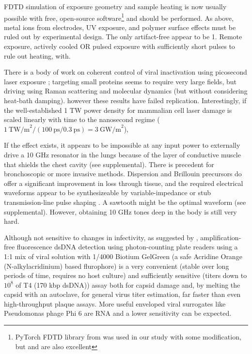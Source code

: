 \documentclass[paper.tex]{subfiles}
\begin{document}
FDTD simulation of exposure geometry and sample heating is now usually possible with free, open-source software\footnote{PyTorch FDTD library from \cite{Highly2019} was used in our study with some modification, but \cite{CUDAbased2019} and \cite{openEMS} are also excellent} and should be performed. As above, metal ions from electrodes, UV exposure, and polymer surface effects\cite{Effect1994a} must be ruled out by experimental design. The only artifact-free appear to be 1. Remote exposure, actively cooled OR pulsed exposure with sufficiently short pulses to rule out heating, with. 

 There is a body of work on coherent control of viral inactivation using picosecond laser exposure \cite{Maximum2010}; targeting small proteins seems to require very large fields\cite{Picosecond2016b}, but driving using Raman scattering \cite{Inactivation2007} \cite{Prospects2012}\cite{Studies2014} and molecular dynamics \cite{Maximum2010} (but without considering heat-bath damping). however these results have failed replication\cite{No2011}. Interestingly, if the well-established 1 TW power density\cite{Targeted2002} for mammalian cell laser damage is scaled linearly with time to the nanosecond regime ($1\ \text{TW/m}^2 / (100\ \text{ps} / 0.3\ \text{ps}) = 3\ \text{GW/m}^2$), 

If the effect exists, it appears to be impossible at any input power to externally drive a 10 GHz resonator in the lungs because of the layer of conductive muscle that shields the chest cavity (see supplemental). There is precedent for bronchoscopic \cite{Flexible2019}\cite{Antenna2018} or more invasive methods. Dispersion and Brillouin precursors do offer a significant improvement in loss through tissue, and the required electrical waveforms appear to be synthesizeable by variable-impedance or stub transmission-line pulse shaping\cite{Arbitrarya} . A sawtooth might be the optimal waveform (see supplemental). However, obtaining 10 GHz tones deep in the body is still very hard.

Although not sensitive to changes in infectivity, as suggested by \cite{Quantification2020}, amplification-free fluorescence dsDNA detection using photon-counting plate readers using a 1:1 mix of viral solution with 1/4000 Biotium GelGreen (a safe Acridine Orange (N-alkylacridinium) based flurophore) is a very convenient (stable over long periods of time, requires no host culture) and sufficiently sensitive (titers down to $10^8$ of T4 (170 kbp dsDNA)) assay both for capsid damage and, by melting the capsid with an autoclave, for general virus titer estimation, far faster than even high-throughput plaque assays. More useful enveloped viral surrogates like Pseudomonas phage Phi 6 are RNA and a lower sensitivity can be expected. 
\end{document}
